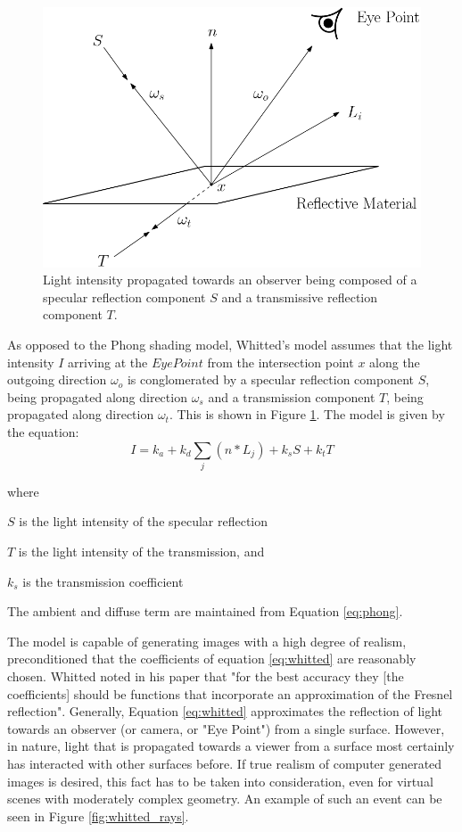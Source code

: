 \begin{figure}[h]
	\centering
	\includegraphics[width=.7\linewidth]{img/1 fundamentals/whitted.png}
	\caption{Light intensity propagated towards an observer being composed of a specular reflection component $S$ and a transmissive reflection component $T$.}
	\label{fig:whitted_model}
\end{figure}

As opposed to the Phong shading model, Whitted's model assumes that the light intensity $I$ arriving at the $Eye Point$ from the intersection point $x$ along the outgoing direction $\omega_{o}$ is conglomerated by a specular reflection component $S$, being propagated along direction $\omega_{s}$ and a transmission component $T$, being propagated along direction $\omega_{t}$. This is shown in Figure \ref{fig:whitted_model}.
The model is given by the equation:
\begin{equation} \label{eq:whitted}
I = k_{a} + k_{d}\sum_{j}(n*L_{j}) + k_{s}S + k_{t}T
\end{equation}

\noindent where
\begin{description}
	\setlength\itemsep{0.05em}
	\item  $S$ is the light intensity of the specular reflection
	\item  $T$ is the light intensity of the transmission, and
	\item  $k_{s}$ is the transmission coefficient
\end{description}
The ambient and diffuse term are maintained from Equation \ref{eq:phong}. 

The model is capable of generating images with a high degree of realism, preconditioned that the coefficients of equation \ref{eq:whitted} are reasonably chosen. Whitted noted in his paper that "for the best
accuracy they [the coefficients] should be functions that incorporate an
approximation of the Fresnel reflection". 
Generally, Equation \ref{eq:whitted} approximates the reflection of light towards an observer (or camera, or "Eye Point") from a single surface. However, in nature, light that is propagated towards a viewer from a surface most certainly has interacted with other surfaces before. If true realism of computer generated images is desired, this fact has to be taken into consideration, even for virtual scenes with moderately complex geometry. An example of such an event can be seen in Figure \ref{fig:whitted_rays}.

